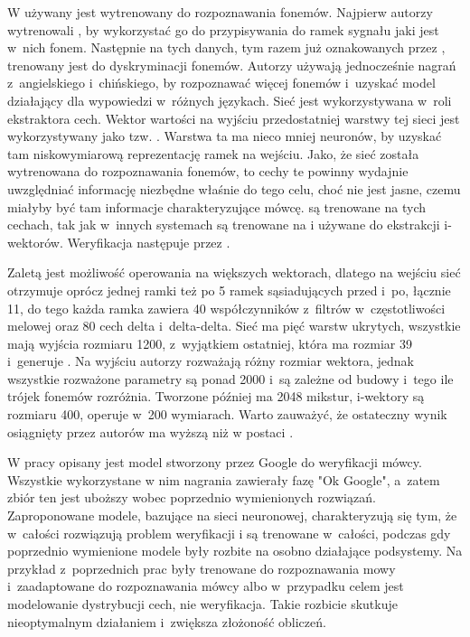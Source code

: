W \cite{investigationOfBottleneck}
używany jest  wytrenowany do rozpoznawania fonemów. Najpierw autorzy wytrenowali
, by wykorzystać go do przypisywania do ramek sygnału jaki
jest w~nich fonem. Następnie na tych danych, tym razem już oznakowanych przez ,
trenowany jest  do dyskryminacji fonemów. Autorzy używają
jednocześnie nagrań z~angielskiego i~chińskiego, by rozpoznawać więcej fonemów i~uzyskać model działający
dla wypowiedzi w~różnych językach.
Sieć jest wykorzystywana w~roli ekstraktora cech. Wektor wartości na wyjściu przedostatniej warstwy
tej sieci jest wykorzystywany jako tzw. .
Warstwa ta ma nieco mniej neuronów, by uzyskać tam niskowymiarową reprezentację ramek na wejściu.
Jako, że sieć została wytrenowana do rozpoznawania fonemów, to cechy te powinny
wydajnie uwzględniać informację niezbędne właśnie do tego celu, choć nie jest jasne, czemu miałyby być
tam informacje charakteryzujące mówcę.
 są trenowane na tych cechach, tak jak w~innych systemach są trenowane na 
i używane do ekstrakcji i-wektorów. Weryfikacja następuje przez .

Zaletą  jest możliwość operowania na większych wektorach, dlatego na wejściu sieć otrzymuje
oprócz jednej ramki też po 5 ramek sąsiadujących przed i~po, łącznie 11,
do tego każda ramka zawiera 40 współczynników z~filtrów w~częstotliwości melowej oraz 80 cech delta i~delta-delta.
Sieć ma pięć warstw ukrytych, wszystkie mają wyjścia rozmiaru 1200, z~wyjątkiem
ostatniej, która ma rozmiar 39 i~generuje . Na wyjściu autorzy rozważają
różny rozmiar wektora, jednak wszystkie rozważone parametry są ponad 2000 i~są zależne
od budowy  i~tego ile trójek fonemów rozróżnia. Tworzone później
 ma 2048 mikstur, i-wektory są rozmiaru 400,  operuje w~200 wymiarach.
Warto zauważyć, że ostateczny wynik osiągnięty przez autorów ma wyższą  niż 
w postaci .

W pracy \cite{endToEnd} opisany jest model stworzony przez Google do weryfikacji mówcy. Wszystkie wykorzystane
w nim nagrania zawierały fazę "Ok Google", a~zatem zbiór ten jest uboższy wobec poprzednio wymienionych rozwiązań.
Zaproponowane modele, bazujące na sieci neuronowej, charakteryzują się tym, że w~całości rozwiązują problem weryfikacji
i są trenowane w~całości, podczas gdy poprzednio wymienione modele były rozbite na osobno działające podsystemy.
Na przykład  z~poprzednich prac były trenowane do rozpoznawania mowy i~zaadaptowane do rozpoznawania
mówcy albo w~przypadku  celem jest modelowanie dystrybucji cech, nie weryfikacja. Takie rozbicie
skutkuje nieoptymalnym działaniem i~zwiększa złożoność obliczeń.

